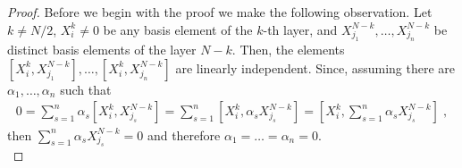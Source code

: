 \documentclass[pdflatex,sn-mathphys-num]{sn-jnl}
\theoremstyle{thmstyletwo}
\theoremstyle{thmstyleone}
\theoremstyle{thmstyletwo}
\begin{document}
	\begin{proof}
		Before we begin with the proof we make the following observation.
		Let $k \neq N/2$, $X_i^k \neq 0$ be any basis element of the $k$-th layer, and $X_{j_1}^{N-k}, \ldots,X_{j_n}^{N-k}$ be distinct basis elements of the layer ${N-k}$. Then, the elements $[X_i^k,X_{j_1}^{N-k}], \ldots, [X_i^k,X_{j_n}^{N-k}]$ are linearly independent. Since, assuming there are $\alpha_1,\ldots, \alpha_n$ such that
		\begin{align*}
			0 = \sum_{s = 1}^{n}\alpha_s[X_i^k,X_{j_s}^{N-k}] = \sum_{s = 1}^{n}[X_i^k,\alpha_s X_{j_s}^{N-k}] = [X_i^k,\sum_{s = 1}^{n}\alpha_s X_{j_s}^{N-k}] \;,
		\end{align*}
		then $\sum_{s = 1}^{n}\alpha_s X_{j_s}^{N-k} = 0$ and therefore $\alpha_{1}= \ldots = \alpha_n = 0$.\\
		

\end{proof}
\end{document}
